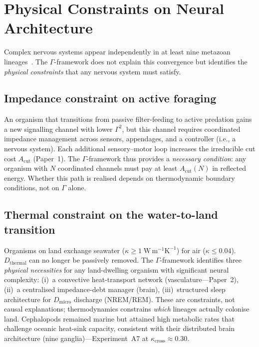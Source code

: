 \documentclass[aps,pre,twocolumn,superscriptaddress,floatfix]{revtex4-2}
\begin{document}
\section{Physical Constraints on Neural Architecture}
\label{sec:brains}

Complex nervous systems appear independently in at least
nine metazoan lineages~\cite{Moroz2012}.
The $\Gamma$-framework does not explain this
convergence but identifies the \emph{physical constraints}
that any nervous system must satisfy.

\subsection{Impedance constraint on active foraging}

An organism that transitions from passive filter-feeding
to active predation gains a new signalling channel
with lower $\Gamma^2$, but this channel requires
coordinated impedance management across sensors,
appendages, and a controller (i.e., a nervous system).
Each additional sensory--motor loop increases the
irreducible cut cost $A_{\mathrm{cut}}$ (Paper~1).
The $\Gamma$-framework thus provides a \emph{necessary
condition}: any organism with $N$ coordinated channels
must pay at least $A_{\mathrm{cut}}(N)$ in reflected energy.
Whether this path is realised depends on
thermodynamic boundary conditions, not on $\Gamma$ alone.

\subsection{Thermal constraint on the water-to-land transition}

Organisms on land exchange seawater
($\kappa \ge 1\;\mathrm{W\,m^{-1}K^{-1}}$)
for air ($\kappa \le 0.04$).
$D_{\mathrm{thermal}}$ can no longer be passively removed.
The $\Gamma$-framework identifies three \emph{physical
necessities} for any land-dwelling organism with
significant neural complexity:
(i)~a convective heat-transport network (vasculature---Paper~2),
(ii)~a centralised impedance-debt manager (brain),
(iii)~structured sleep architecture for $D_{\mathrm{micro}}$
discharge (NREM/REM).
These are constraints, not causal explanations;
thermodynamics constrains \emph{which} lineages
actually colonise land.
Cephalopods remained marine but attained high metabolic
rates that challenge oceanic heat-sink capacity,
consistent with their distributed brain architecture
(nine ganglia)---Experiment~A7 at
$\kappa_{\mathrm{cross}} \approx 0.30$.
\end{document}
